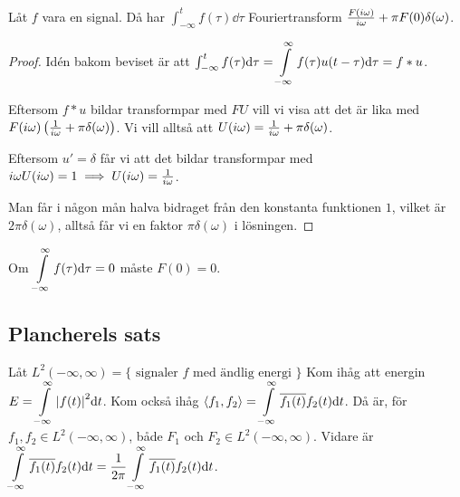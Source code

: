 \documentclass[a4paper]{article}
\begin{document}
\begin{sats}
    Låt \(
        f
    \) vara en signal. Då har \(
        \int_{-\infty}^t f(\tau) \dd \tau
    \) Fouriertransform \(
        \frac{F(i\omega)}{i\omega} + \pi F(0) \delta(\omega)
    \). 

    \begin{proof}
        Idén bakom beviset är att \(
            \int_{-\infty}^t f(\tau) \dd \tau 
            = \displaystyle\int\limits_{-\infty}^{\infty} f(\tau) u(t - \tau) \dd \tau
            = f * u
        \).

        Eftersom \(
            f * u 
        \) bildar transformpar med \(
            FU
        \) vill vi visa att det är lika med \(
            F(i\omega) \left( \frac{1}{i\omega} + \pi \delta(\omega) \right)
        \). Vi vill alltså att \(
            U(i\omega) = \frac{1}{i\omega} + \pi \delta(\omega)
        \).

        Eftersom \(
            u' = \delta 
        \) får vi att det bildar transformpar med \(
            i\omega U(i\omega) = 1 \implies U(i\omega) = \frac{1}{i\omega}
        \).

        Man får i någon mån halva bidraget från den konstanta funktionen \(
            1
        \), vilket är \(
            2\pi\delta(\omega)
        \), alltså får vi en faktor \(
            \pi\delta(\omega)
        \) i lösningen.
    \end{proof}
\end{sats}

Om \(
    \displaystyle\int\limits_{-\infty}^{\infty} f(\tau) \dd \tau = 0
\) måste \(
    F(0) = 0
\).

\subsection{Plancherels sats}
\begin{sats}
    Låt \(
        L^2(-\infty, \infty) = \{\text{ signaler } f \text{ med ändlig energi } \}
    \) Kom ihåg att energin \(
        E = \displaystyle\int\limits_{-\infty}^{\infty} \abs{f(t)}^2 \dd t
    \). Kom också ihåg \(
        \left\langle f_1, f_2 \right\rangle = \displaystyle\int\limits_{-\infty}^{\infty} \overline{f_1(t)} f_2(t) \dd t
    \). Då är, för \(
        f_1, f_2 \in L^2(-\infty, \infty) 
    \), både \(
        F_1
    \) och \(
        F_2 \in L^2(-\infty, \infty) 
    \). Vidare är \(
        \displaystyle\int\limits_{-\infty}^{\infty} \overline{f_1(t)} f_2(t) \dd t 
        = \frac{1}{2\pi} \displaystyle\int\limits_{-\infty}^{\infty} \overline{f_1(t)} f_2(t) \dd t
    \).
\end{sats}
\end{document}
